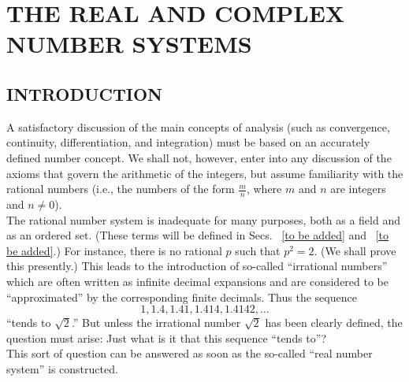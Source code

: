 %
%
%
\chapter{THE REAL AND COMPLEX NUMBER SYSTEMS}
\label{intro} %


\section{INTRODUCTION}
A satisfactory discussion of the main concepts of analysis (such as convergence, continuity, differentiation, and integration) 
must be based on an accurately defined number concept. We shall not, however, enter into any discussion of 
the axioms that govern the arithmetic of the integers, but assume familiarity with the rational numbers 
(i.e., the numbers of the form $\frac{m}{n}$, where $m$ and $n$ are integers and $n\not=0$).\\
The rational number system is inadequate for many purposes, both as a field and as an ordered set. (These terms will 
be defined in Secs. ~\ref{to be added} and ~\ref{to be added}.) For instance, there is no rational $p$ such that 
$p^2=2$. (We shall prove this presently.) This leads to the introduction of so-called ``irrational numbers'' 
which are often written as infinite decimal expansions and are considered to be ``approximated'' by the corresponding 
finite decimals. Thus the sequence
\begin{equation*}
    1, 1.4, 1.41, 1.414, 1.4142, \dots
\end{equation*}
``tends to $\sqrt{2}$.'' But unless the irrational number $\sqrt{2}$ has been clearly defined, the question must arise: 
Just what is it that this sequence ``tends to''?\\
\indent This sort of question can be answered as soon as the so-called ``real number system'' is constructed.

